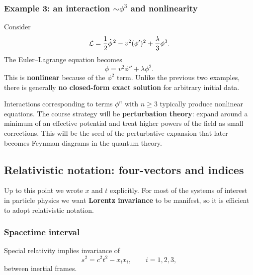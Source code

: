 \subsubsection*{Example 3: an interaction \(\sim \phi^3\) and nonlinearity}

Consider
\begin{equation}
  \mathcal{L} = \frac12 \dot\phi^{\,2} - v^2(\phi')^2 + \frac{\lambda}{3}\phi^3.
  \label{eq:lec02:L-cubic}
\end{equation}
The Euler--Lagrange equation becomes
\begin{equation}
  \ddot\phi = v^2\phi'' + \lambda \phi^2.
  \label{eq:lec02:cubic-eom}
\end{equation}
This is \textbf{nonlinear} because of the \(\phi^2\) term. Unlike the
previous two examples, there is generally \textbf{no closed-form exact
solution} for arbitrary initial data.

\begin{remark}
Interactions corresponding to terms \(\phi^n\) with \(n\ge 3\) typically
produce nonlinear equations. The course strategy will be
\textbf{perturbation theory}: expand around a minimum of an effective
potential and treat higher powers of the field as small corrections.
This will be the seed of the perturbative expansion that later becomes
Feynman diagrams in the quantum theory.
\end{remark}

\subsection*{Relativistic notation: four-vectors and indices}

Up to this point we wrote \(x\) and \(t\) explicitly. For most of the
systems of interest in particle physics we want \textbf{Lorentz
invariance} to be manifest, so it is efficient to adopt relativistic
notation.

\subsubsection*{Spacetime interval}

Special relativity implies invariance of
\begin{equation}
  s^2 = c^2t^2 - x_i x_i,
  \qquad i=1,2,3,
\end{equation}
between inertial frames.

